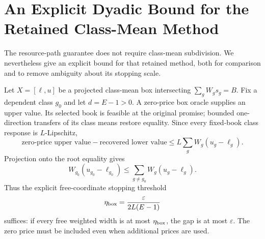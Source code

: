 \section{An Explicit Dyadic Bound for the Retained Class-Mean Method}\label{sec:dyadic52}
The resource-path guarantee does not require class-mean subdivision. We nevertheless give an explicit bound for that retained method, both for comparison and to remove ambiguity about its stopping scale.

Let $X=[\ell,u]$ be a projected class-mean box intersecting $\sum_gW_gs_g=B$. Fix a dependent class $g_0$ and let $d=E-1>0$. A zero-price box oracle supplies an upper value. Its selected book is feasible at the original promise; bounded one-direction transfers of its class means restore equality. Since every fixed-book class response is $L$-Lipschitz,
\[
 \text{zero-price upper value}-\text{recovered lower value}
 \leq L\sum_gW_g(u_g-\ell_g).
\]
Projection onto the root equality gives
\[
 W_{g_0}(u_{g_0}-\ell_{g_0})\leq\sum_{g\ne g_0}W_g(u_g-\ell_g).
\]
Thus the explicit free-coordinate stopping threshold
\begin{equation}\label{eq:etabox52}
 \eta_{\rm box}=\frac{\varepsilon}{2L(E-1)}
\end{equation}
suffices: if every free weighted width is at most $\eta_{\rm box}$, the gap is at most $\varepsilon$. The zero price must be included even when additional prices are used.

